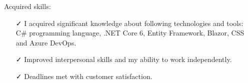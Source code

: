 \documentclass[english,10pt,a4paper]{article}
\newcommand{\Color}[1]{\textcolor{CvColor}{#1}}
\newcommand{\CvCheck}{\textcolor{CvColor}{\faCheck}}
\begin{document}
\begin{paracol}{2}
\begin{tcolorbox}[colback=white, height=\textheight, colframe=white, left=0cm]
\begin{itemize}
{\begin{itemize}
					
					\textcolor{CvColor}{Acquired skills:}
					\begin{itemize}
						\item[\CvCheck] I acquired significant knowledge about following technologies and tools: \Color{C\#} programming language, \Color{.NET Core 6}, \Color{Entity Framework}, \Color{Blazor}, \Color{CSS} and \Color{Azure DevOps}.
						\item[\CvCheck] Improved interpersonal skills and my ability to work independently.
						\item[\CvCheck] Deadlines met with customer satisfaction. 
					\end{itemize}						
				\end{itemize}
			}
		
		
		
		
	\end{itemize}
	



\end{tcolorbox}
\end{paracol}
\newpage
\end{document}
